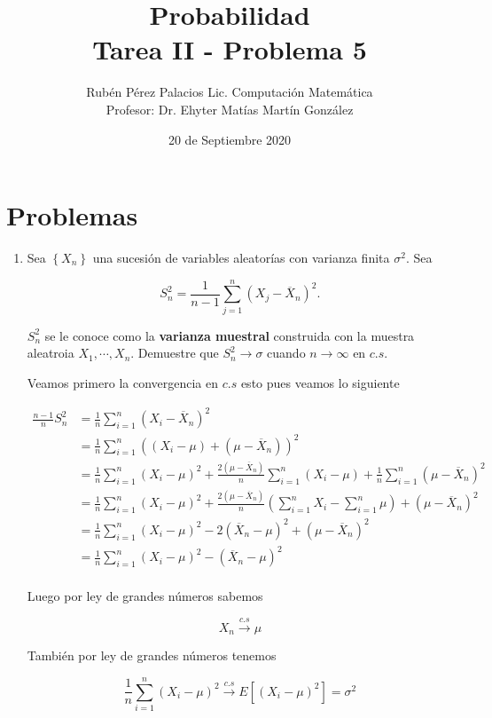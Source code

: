 \documentclass[letterpaper]{article}
\title{Probabilidad \\Tarea II - Problema 5}
\author{Rubén Pérez Palacios Lic. Computación Matemática\\Profesor: Dr. Ehyter Matías Martín González}
\date{20 de Septiembre 2020}
\newcommand{\pars}[1]{\left( #1 \right) }
\newcommand{\bracs}[1]{\left[ #1 \right] }
\newcommand{\set}[1]{\left \{ #1 \right\} }
\newcommand{\1}{\mathbbm{1}}
\begin{document}
	\maketitle
    
    \section*{Problemas}

    \begin{enumerate}
        
        \item Sea $\set{X_n}$ una sucesión de variables aleatorías con varianza finita $\sigma^2$. Sea 
		
		\[S_n^2 = \frac{1}{n-1}\sum_{j=1}^n \pars{X_j - \overline{X}_n}^2.\]

		$S_n^2$ se le conoce como la \textbf{varianza muestral} construida con la muestra aleatroia \linebreak $X_1,\cdots,X_n$. Demuestre que $S_n^2\rightarrow\sigma$ cuando $n \rightarrow \infty$ en $c.s$.

		Veamos primero la convergencia en $c.s$ esto pues veamos lo siguiente

		\begin{align*}
			\frac{n-1}{n} S_n^2 &= \frac{1}{n}\sum_{i=1}^n\pars{X_i-\overline{X}_n}^2\\
			&= \frac{1}{n}\sum_{i=1}^n\pars{\pars{X_i-\mu}+\pars{\mu-\overline{X}_n}}^2\\
			&= \frac{1}{n}\sum_{i=1}^n\pars{X_i-\mu}^2 + \frac{2\pars{\mu - \overline{X}_n}}{n}\sum_{i=1}^n\pars{X_i-\mu} + \frac{1}{n}\sum_{i=1}^n\pars{\mu-\overline{X}_n}^2\\
			&= \frac{1}{n}\sum_{i=1}^n\pars{X_i-\mu}^2 + \frac{2\pars{\mu - \overline{X}_n}}{n}\pars{\sum_{i=1}^nX_i - \sum_{i=1}^n\mu} + \pars{\mu-\overline{X}_n}^2\\
			&= \frac{1}{n}\sum_{i=1}^n\pars{X_i-\mu}^2 - 2\pars{\overline{X}_n - \mu}^2 + \pars{\mu-\overline{X}_n}^2\\
			&= \frac{1}{n}\sum_{i=1}^n\pars{X_i-\mu}^2 - \pars{\overline{X}_n - \mu}^2\\
		\end{align*}

		Luego por ley de grandes números sabemos 

		\[X_n \xrightarrow{c.s} \mu\]

		También por ley de grandes números tenemos

		\[\frac{1}{n}\sum_{i=1}^n\pars{X_i-\mu}^2 \xrightarrow{c.s} E\bracs{\pars{X_i-\mu}^2} = \sigma^2\]


\end{enumerate}
\end{document}
